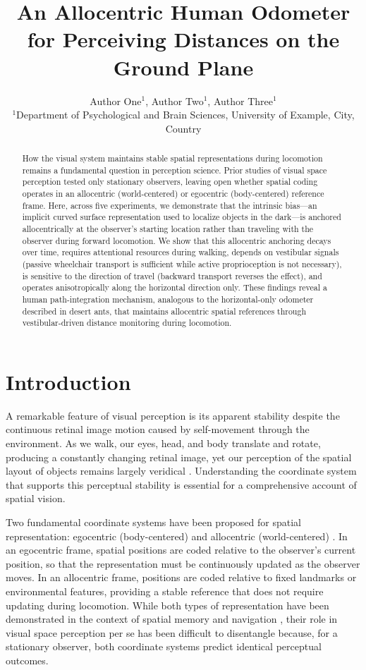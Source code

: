 \documentclass[12pt]{article}
\title{An Allocentric Human Odometer for Perceiving Distances on the Ground Plane}
\author{Author One$^{1}$, Author Two$^{1}$, Author Three$^{1}$ \\
\small $^{1}$Department of Psychological and Brain Sciences, University of Example, City, Country}
\date{}
\begin{document}
\maketitle

\begin{abstract}
How the visual system maintains stable spatial representations during locomotion remains a fundamental question in perception science. Prior studies of visual space perception tested only stationary observers, leaving open whether spatial coding operates in an allocentric (world-centered) or egocentric (body-centered) reference frame. Here, across five experiments, we demonstrate that the intrinsic bias---an implicit curved surface representation used to localize objects in the dark---is anchored allocentrically at the observer's starting location rather than traveling with the observer during forward locomotion. We show that this allocentric anchoring decays over time, requires attentional resources during walking, depends on vestibular signals (passive wheelchair transport is sufficient while active proprioception is not necessary), is sensitive to the direction of travel (backward transport reverses the effect), and operates anisotropically along the horizontal direction only. These findings reveal a human path-integration mechanism, analogous to the horizontal-only odometer described in desert ants, that maintains allocentric spatial references through vestibular-driven distance monitoring during locomotion.
\end{abstract}

\section{Introduction}

A remarkable feature of visual perception is its apparent stability despite the continuous retinal image motion caused by self-movement through the environment. As we walk, our eyes, head, and body translate and rotate, producing a constantly changing retinal image, yet our perception of the spatial layout of objects remains largely veridical \citep{gibson1979, loomis2002}. Understanding the coordinate system that supports this perceptual stability is essential for a comprehensive account of spatial vision.

Two fundamental coordinate systems have been proposed for spatial representation: egocentric (body-centered) and allocentric (world-centered) \citep{klatzky1998, burgess2006}. In an egocentric frame, spatial positions are coded relative to the observer's current position, so that the representation must be continuously updated as the observer moves. In an allocentric frame, positions are coded relative to fixed landmarks or environmental features, providing a stable reference that does not require updating during locomotion. While both types of representation have been demonstrated in the context of spatial memory and navigation \citep{mou2004, waller2006}, their role in visual space perception per se has been difficult to disentangle because, for a stationary observer, both coordinate systems predict identical perceptual outcomes.
\end{document}
